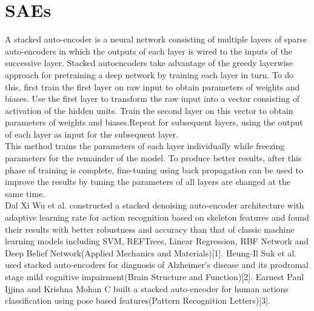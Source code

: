 \documentclass{kththesis}
\begin{document}
\section{SAEs}
A stacked auto-encoder is a neural network consisting of multiple layers of sparse auto-encoders in which the outputs of each layer is wired to the inputs of the successive layer. Stacked autoencoders take advantage of the greedy layerwise approach for pretraining a deep network by training each layer in turn. To do this, first train the first layer on raw input to obtain parameters of weights and biases. Use the first layer to transform the raw input into a vector consisting of activation of the hidden units. Train the second layer on this vector to obtain parameters of weights and biases.Repeat for subsequent layers, using the output of each layer as input for the subsequent layer.\\
This method trains the parameters of each layer individually while freezing parameters for the remainder of the model. To produce better results, after this phase of training is complete, fine-tuning using back propagation can be used to improve the results by tuning the parameters of all layers are changed at the same time.
\\
Dal Xi Wu et al. constructed  a stacked denoising auto-encoder architecture with adaptive learning rate for action recognition based on skeleton features and found their results with better robustness and accuracy than that of classic machine learning models including SVM, REFTrees, Linear Regression, RBF Network and Deep Belief Network(Applied Mechanics and Materials)[1]. Heung-Il Suk et al. used stacked auto-encoders for diagnosis of Alzheimer's disease and its prodromal stage mild cognitive impairment(Brain Structure and Function)[2]. Earnest Paul Ijjina and Krishna Mohan C built a stacked auto-encoder for human actions classification using pose based features(Pattern Recognition Letters)[3].
\\
\end{document}
